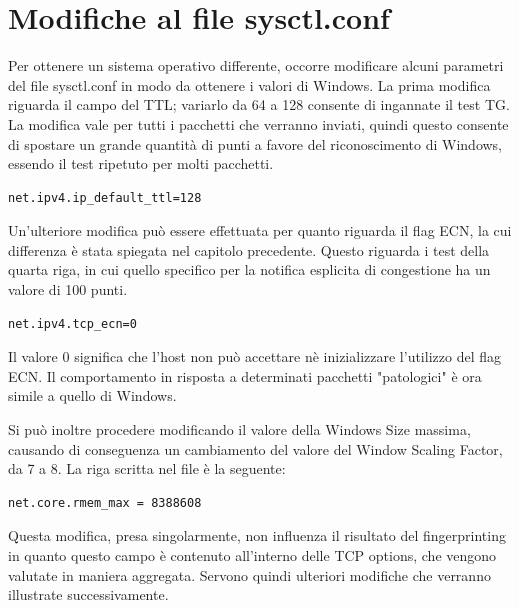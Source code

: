 \section{Modifiche al file sysctl.conf}
Per ottenere un sistema operativo differente, occorre modificare alcuni parametri del file sysctl.conf in modo da ottenere i valori di Windows.
La prima modifica riguarda il campo del TTL; variarlo da 64 a 128 consente di ingannate il test TG. La modifica vale per tutti i pacchetti che verranno inviati, quindi questo consente di spostare un grande quantità di punti a favore del riconoscimento di Windows, essendo il test ripetuto per molti pacchetti.

\begin{lstlisting}[caption={Modifica al campo TTL nel file sysctl.conf}, label=listing_ttl]
	net.ipv4.ip_default_ttl=128
\end{lstlisting}

Un'ulteriore modifica può essere effettuata per quanto riguarda il flag ECN, la cui differenza è stata spiegata nel capitolo precedente. Questo riguarda i test della quarta riga, in cui quello specifico per la notifica esplicita di congestione ha un valore di 100 punti.

\begin{lstlisting}[caption={Modifica al campo ECN nel file sysctl.conf}]
	net.ipv4.tcp_ecn=0
\end{lstlisting} 

Il valore 0 significa che l'host non può accettare nè inizializzare l'utilizzo del flag ECN. Il comportamento in risposta a determinati pacchetti "patologici" è ora simile a quello di Windows.

Si può inoltre procedere modificando il valore della Windows Size massima, causando di conseguenza un cambiamento del valore del Window Scaling Factor, da 7 a 8. 
La riga scritta nel file è la seguente:

\begin{lstlisting}[caption={Modifica alla Windows Size massima nel file sysctl.conf}, label=listingscaling]
	net.core.rmem_max = 8388608
\end{lstlisting}

Questa modifica, presa singolarmente, non influenza il risultato del fingerprinting in quanto questo campo è contenuto all'interno delle TCP options, che vengono valutate in maniera aggregata. Servono quindi ulteriori modifiche che verranno illustrate successivamente.

